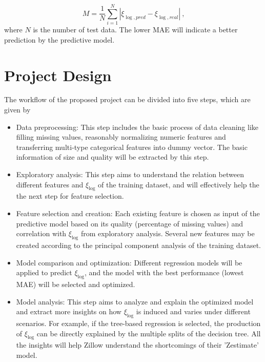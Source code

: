 \documentclass[12pt]{article}
\begin{document}
\begin{equation}
M=\frac{1}{N}\sum_{i=1}^{N}\left|\xi_{\log,pred}-\xi_{\log,real}\right|~\text{,}
\label{eq:define-evaluation-metric}
\end{equation}
where $N$ is the number of test data. The lower MAE will indicate a better prediction by the predictive model.

\section{Project Design}\label{sec:design}
The workflow of the proposed project can be divided into five steps, which are given by

\begin{itemize}
	\item Data preprocessing: This step includes the basic process of data cleaning like filling missing values, reasonably normalizing numeric features and transferring multi-type categorical features into dummy vector. The basic information of size and quality will be extracted by this step.
\end{itemize}

\begin{itemize}
	\item Exploratory analysis: This step aims to understand the relation between different features and $\xi_{\log}$ of the training dataset, and will effectively help the the next step for feature selection.  
\end{itemize}

\begin{itemize}
	\item Feature selection and creation: Each existing feature is chosen as input of the predictive model based on its quality (percentage of missing values) and correlation with $\xi_{\log}$ from exploratory analysis. Several new features may be created according to the principal component analysis of the training dataset.
\end{itemize}

\begin{itemize}
	\item Model comparison and optimization: Different regression models will be applied to predict $\xi_{\log}$, and the model with the best performance (lowest MAE) will be selected and optimized.
\end{itemize}

\begin{itemize}
	\item Model analysis: This step aims to analyze and explain the optimized model and extract more insights on how $\xi_{\log}$ is induced and varies under different scenarios. For example, if the tree-based regression is selected, the production of $\xi_{\log}$ can be directly explained by the multiple splits of the decision tree. All the insights will help Zillow understand the shortcomings of their 'Zestimate' model.
\end{itemize}
\end{document}
